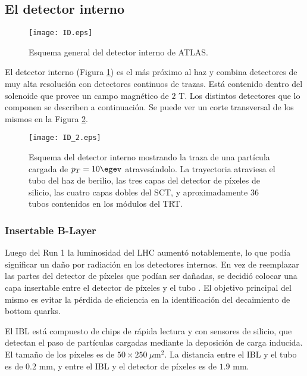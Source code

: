 \subsection{El detector interno}

\begin{figure}
\centering
\texttt{[image: ID.eps]}
\caption{Esquema general del detector interno de ATLAS.}
\label{ID}
\end{figure}

El detector interno (Figura \ref{ID}) es el más próximo al haz y combina detectores de muy alta resolución con detectores continuos de trazas. Está contenido dentro del solenoide que provee un campo magnético de $2$ T. Los distintos detectores que lo componen se describen a continuación. Se puede ver un corte transversal de los mismos en la Figura \ref{ID_2}.

\begin{figure}
\centering
\texttt{[image: ID\_2.eps]}
\caption{Esquema del detector interno mostrando la traza de una partícula cargada de $p_{T}=10 \egev$ atravesándolo. La trayectoria atraviesa el tubo del haz de  berilio, las tres capas del detector de píxeles de silicio, las cuatro capas dobles del SCT, y aproximadamente 36 tubos contenidos en los módulos del TRT.}
\label{ID_2}
\end{figure}
\vspace{0.5cm}

\subsubsection{Insertable B-Layer}

Luego del Run 1 la luminosidad del LHC aumentó notablemente, lo que podía significar un daño por radiación en los detectores internos. En vez de reemplazar las partes del detector de píxeles que podían ser dañadas, se decidió colocar una capa insertable entre el detector de píxeles y el tubo . El objetivo principal del mismo es evitar la pérdida de eficiencia en la identificación del decaimiento de bottom quarks.

El IBL está compuesto de chips de rápida lectura y con sensores de silicio, que detectan el paso de partículas cargadas mediante la deposición de carga inducida. El tamaño de los píxeles es de $50\times250\:\mu$m$^{2}$. La distancia entre el IBL y el tubo es de $0.2$ mm, y entre el IBL y el detector de píxeles es de $1.9$ mm. 

